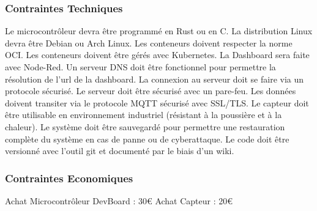 \documentclass[a4paper,11pt]{article}
\begin{document}
    \subsubsection{Contraintes Techniques}
    Le microcontrôleur devra être programmé en Rust ou en C.\newline
    La distribution Linux devra être Debian ou Arch Linux.\newline
    Les conteneurs doivent respecter la norme OCI.\newline
    Les conteneurs doivent être gérés avec Kubernetes.\newline
    La Dashboard sera faite avec Node-Red.\newline
    Un serveur DNS doit être fonctionnel pour permettre la résolution de l’url de la dashboard.\newline
    La connexion au serveur doit se faire via un protocole sécurisé.\newline
    Le serveur doit être sécurisé avec un pare-feu.\newline
    Les données doivent transiter via le protocole MQTT sécurisé avec SSL/TLS.\newline
    Le capteur doit être utilisable en environnement industriel (résistant à la poussière et à la chaleur).\newline
    Le système doit être sauvegardé pour permettre une restauration complète du système en cas de panne ou de cyberattaque.\newline
    Le code doit être versionné avec l’outil git et documenté par le biais d’un wiki.\newline

    \subsubsection{Contraintes Economiques}
    Achat Microcontrôleur DevBoard : 30€ \newline
    Achat Capteur : 20€
\end{document}
